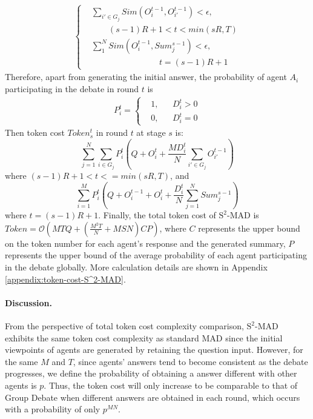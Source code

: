 \begin{equation}
\begin{split}
\left\{
\begin{aligned}
&\sum_{i'\in G_j} Sim(O_i^{t-1} ,O_{i'}^{t-1})<\epsilon,\\
&\qquad (s-1)R+1<t<min(sR,T)\\
&\sum_{1}^{N} Sim(O_i^{t-1},Sum_{j}^{s-1})<\epsilon,\\
&\qquad\qquad\qquad\qquad t=(s-1)R+1
\end{aligned}
\right.
\end{split}
\end{equation}
Therefore, apart from generating the initial answer, the probability of agent $A_i$ participating in the debate in round $t$ is
\begin{equation}
\begin{split}
P_i^t=
\left\{
\begin{aligned}
&1, && D^t_i>0\\  
&0, && D^t_i=0
\end{aligned}
\right.
\end{split}
\end{equation}
Then token cost $Token^t_s$ in round $t$ at stage $s$ is:
\begin{equation}
\sum_{j=1}^N\sum_{i\in G_j} P_i^t(Q+O_i^t+\frac{MD_i^t}{N}\sum_{i'\in G_j}O_{i'}^{t-1})
\end{equation}
where $(s-1)R + 1 < t <= min(sR, T)$,  and 
\begin{equation}
    \sum_{i=1}^MP_i^t(Q+O_i^{t-1}+O_i^t+\frac{D_i^t}{N}\sum_{j=1}^NSum_j^{s-1})
\end{equation}
where $t = (s-1)R + 1$. Finally, the total token cost of \({\text{S}^2\text{-MAD}}\) is $Token = \mathcal{O}\left(MTQ+(\frac{M^2T}{N}+MSN)CP\right)$, where $C$ represents the upper bound on the token number for each agent's response and the generated summary, $P$ represents the upper bound of the average probability of each agent participating in the debate globally. More calculation details are shown in Appendix \ref{appendix:token-cost-S^2-MAD}.

\paragraph{Discussion.} From the perspective of total token cost complexity comparison, \({\text{S}^2\text{-MAD}}\) exhibits the same token cost complexity as standard MAD since the initial viewpoints of agents are generated by retaining the question input. However, for the same $M$ and $T$, since agents’ answers tend to become consistent as the debate progresses, we define the probability of obtaining a answer different with other agents is $p$. Thus, the token cost will only increase to be comparable to that of Group Debate when different answers are obtained in each round, which occurs with a probability of only $p^{MN}$.
